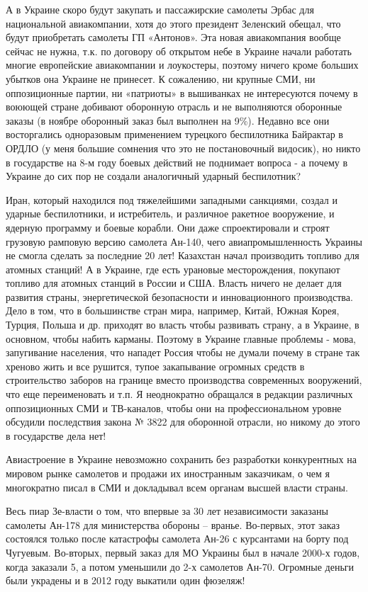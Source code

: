 А в Украине скоро будут закупать и пассажирские самолеты Эрбас для национальной
авиакомпании, хотя до этого президент Зеленский обещал, что будут приобретать
самолеты ГП «Антонов». Эта новая авиакомпания вообще сейчас не нужна, т.к. по
договору об открытом небе в Украине начали работать многие европейские
авиакомпании и лоукостеры, поэтому ничего кроме больших убытков она Украине не
принесет. К сожалению, ни крупные СМИ, ни оппозиционные партии, ни «патриоты» в
вышиванках не интересуются почему в воюющей стране добивают оборонную отрасль и
не выполняются оборонные заказы (в ноябре оборонный заказ был выполнен на 9\%).
Недавно все они восторгались одноразовым применением турецкого беспилотника
Байрактар в ОРДЛО (у меня большие сомнения что это не постановочный видосик),
но никто в государстве на 8-м году боевых действий не поднимает вопроса - а
почему в Украине до сих пор не создали аналогичный ударный беспилотник?

Иран, который находился под тяжелейшими западными санкциями, создал и ударные
беспилотники, и истребитель, и различное ракетное вооружение, и ядерную
программу и боевые корабли. Они даже спроектировали и строят грузовую рамповую
версию самолета Ан-140, чего авиапромышленность Украины не смогла сделать за
последние 20 лет! Казахстан начал производить топливо для атомных станций! А в
Украине, где есть урановые месторождения, покупают топливо для атомных станций
в России и США. Власть ничего не делает для развития страны, энергетической
безопасности и инновационного производства. Дело в том, что в большинстве стран
мира, например, Китай, Южная Корея, Турция, Польша и др. приходят во власть
чтобы развивать страну, а в Украине, в основном, чтобы набить карманы. Поэтому
в Украине главные проблемы - мова, запугивание населения, что нападет Россия
чтобы не думали почему в стране так хреново жить и все рушится, тупое
закапывание огромных средств в строительство заборов на границе вместо
производства современных вооружений, что еще переименовать и т.п. Я
неоднократно обращался в редакции различных оппозиционных СМИ и ТВ-каналов,
чтобы они на профессиональном уровне обсудили последствия закона № 3822 для
оборонной отрасли, но никому до этого в государстве дела нет!

Авиастроение в Украине невозможно сохранить без разработки конкурентных на
мировом рынке самолетов и продажи их иностранным заказчикам, о чем я
многократно писал в СМИ и докладывал всем органам высшей власти страны.

Весь пиар Зе-власти о том, что впервые за 30 лет независимости заказаны
самолеты Ан-178 для министерства обороны – вранье. Во-первых, этот заказ
состоялся только после катастрофы самолета Ан-26 с курсантами на борту под
Чугуевым. Во-вторых, первый заказ для МО Украины был в начале 2000-х годов,
когда заказали 5, а потом уменьшили до 2-х самолетов Ан-70. Огромные деньги
были украдены и в 2012 году выкатили один фюзеляж!

